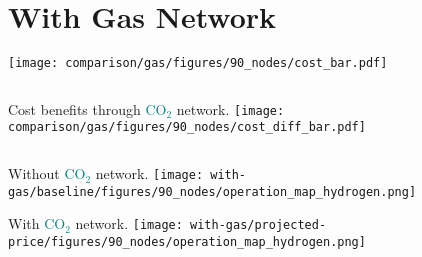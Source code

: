 \documentclass[12pt, aspectratio=169]{beamer}
\newcommand{\carbon}{\textcolor{teal}{CO$_2$}}
\begin{document}






\section*{With Gas Network}

\begin{frame}
    \texttt{[image: comparison/gas/figures/90\_nodes/cost\_bar.pdf]}
\end{frame}

\begin{frame}
    \begin{columns}
        Cost benefits through \carbon{} network.
        \texttt{[image: comparison/gas/figures/90\_nodes/cost\_diff\_bar.pdf]}
    \end{columns}
\end{frame}


\begin{frame}
    \begin{center}
    Without \carbon{} network.
    \texttt{[image: with-gas/baseline/figures/90\_nodes/operation\_map\_hydrogen.png]}
    \end{center}
\end{frame}


\begin{frame}
    \begin{center}
    With \carbon{} network.
    \texttt{[image: with-gas/projected-price/figures/90\_nodes/operation\_map\_hydrogen.png]}
    \end{center}
\end{frame}
\end{document}
